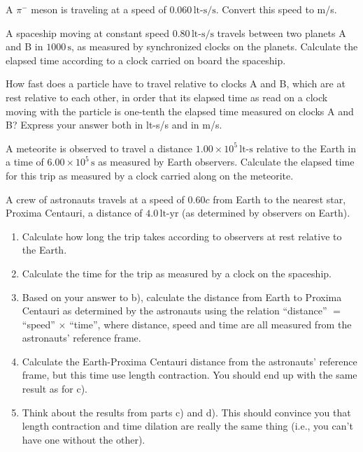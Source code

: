 \begin{exercise}
A $\pi^-$ meson is traveling at a speed of $0.060\,\text{lt-s/s}$.  
Convert this speed to m/s. 
\label{prob:rel_units2}
\end{exercise}

\begin{exercise}
A spaceship moving at constant speed $0.80\,\text{lt-s/s}$
travels between two planets A and B in $1000\,\text{s}$, as measured by
synchronized clocks on the planets.  Calculate the elapsed time
according to a clock carried on board the spaceship.  
\end{exercise}

\begin{exercise}
How fast does a particle have to travel relative to clocks A and
B, which are at rest relative to each other, in order that its elapsed
time as read on a clock moving with the particle is one-tenth the
elapsed time measured on clocks A and B?  Express your answer both in
lt-s/s and in m/s.
\label{prob:time_dilation1}
\end{exercise}
  
\begin{exercise}
  A meteorite is observed to travel a distance $1.00 \times
  10^5\,\text{lt-s}$ relative to the Earth in a time of $6.00 \times
  10^5\,\text{s}$ as measured by Earth observers.  Calculate the
  elapsed time for this trip as measured by a clock carried along on
  the meteorite.
\label{prob:meteorite}
\end{exercise}

\begin{exercise}
A crew of astronauts travels at a speed of $0.60c$ from Earth to
the nearest star, Proxima Centauri, a distance of $4.0\,\text{lt-yr}$ 
(as determined by observers on Earth).
   \begin{enumerate}
   \item Calculate how long the trip takes according to observers at
   rest relative to the Earth. 
   \item Calculate the time for the trip as measured by a clock on the
   spaceship. 
   \item Based on your answer to b), calculate the distance from
   Earth to Proxima Centauri as determined by the astronauts using the
   relation ``distance'' $=$ ``speed'' $\times$ ``time'', where 
   distance, speed and
   time are all measured from the astronauts' reference frame.
   \item Calculate the Earth-Proxima Centauri distance from the
   astronauts' reference frame, but this time use length contraction.
   You should end up with the same result as for c).
   \item Think about the results from parts c) and d).  This should
   convince you that length contraction and time dilation are really
   the same thing (i.e., you can't have one without the other).  
   \end{enumerate}
\label{prob:alpha_centauri}
\end{exercise}

